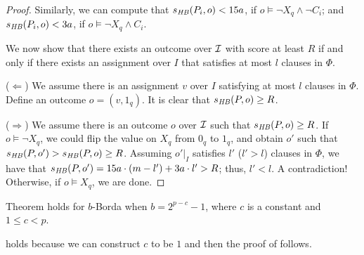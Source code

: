 \begin{proof}
Similarly, we can compute that
$s_{\mathit{HB}}(P_i,o)<15a$, if $o \models \neg X_q \land \neg C_i$; and
$s_{\mathit{HB}}(P_i,o)<3a$, if $o \models \neg X_q \land C_i$.

We now show that there exists an outcome over $\mathcal{I}$ with score at least 
$R$ if and only if there exists an assignment over $I$ that satisfies at 
most $l$ clauses in $\Phi$.

\smallskip
\noindent
($\Leftarrow$) We assume there is an assignment $v$ over $I$ satisfying at 
most $l$ clauses in $\Phi$. Define an outcome $o=(v,1_q)$. It is clear 
that $s_{\mathit{HB}}(P,o)\geq R$.

\smallskip
\noindent
($\Rightarrow$) We assume there is an outcome $o$ over $\mathcal{I}$ such that 
$s_{\mathit{HB}}(P,o)\geq R$. If $o \models \neg X_q$, we could flip the value 
on $X_q$ from $0_q$ to $1_q$, and obtain $o'$ such that 
$s_{\mathit{HB}}(P,o')>s_{\mathit{HB}}(P,o)\geq R$. Assuming $o'|_I$ satisfies $l'$ 
($l'>l$) clauses in $\Phi$, we have that 
$s_{\mathit{HB}}(P,o')=15a\cdot (m-l')+3a\cdot l'> R$; thus, $l'<l$. A contradiction!
Otherwise, if $o \models X_q$, we are done.
\end{proof}

\begin{cor}
\label{cor:confusing}
	Theorem  holds for $b$-Borda when 
	$b=2^{p-c}-1$, where $c$ is a constant and $1 \leq c < p$.
\end{cor}
 holds because we can construct $c$ to be $1$ and then
the proof of  follows.

